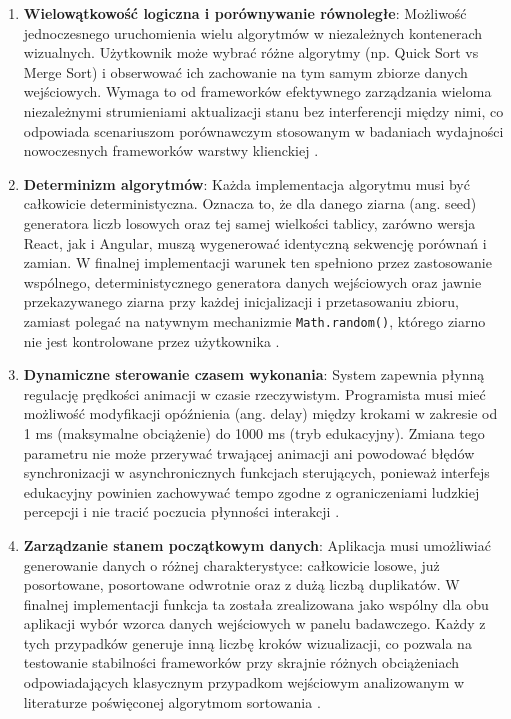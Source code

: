 \documentclass[12pt,openright,twoside]{report}
\begin{document}
\begin{enumerate}
  \item \textbf{Wielowątkowość logiczna i porównywanie równoległe}: Możliwość jednoczesnego uruchomienia wielu algorytmów w niezależnych kontenerach wizualnych. Użytkownik może wybrać różne algorytmy (np. Quick Sort vs Merge Sort) i obserwować ich zachowanie na tym samym zbiorze danych wejściowych. Wymaga to od frameworków efektywnego zarządzania wieloma niezależnymi strumieniami aktualizacji stanu bez interferencji między nimi, co odpowiada scenariuszom porównawczym stosowanym w badaniach wydajności nowoczesnych frameworków warstwy klienckiej \cite{Evaluating_Frameworks}.
  \item \textbf{Determinizm algorytmów}: Każda implementacja algorytmu musi być całkowicie deterministyczna. Oznacza to, że dla danego ziarna (ang. seed) generatora liczb losowych oraz tej samej wielkości tablicy, zarówno wersja React, jak i Angular, muszą wygenerować identyczną sekwencję porównań i zamian. W finalnej implementacji warunek ten spełniono przez zastosowanie wspólnego, deterministycznego generatora danych wejściowych oraz jawnie przekazywanego ziarna przy każdej inicjalizacji i przetasowaniu zbioru, zamiast polegać na natywnym mechanizmie \texttt{Math.random()}, którego ziarno nie jest kontrolowane przez użytkownika \cite{MDN_Math_Random}.
  \item \textbf{Dynamiczne sterowanie czasem wykonania}: System zapewnia płynną regulację prędkości animacji w czasie rzeczywistym. Programista musi mieć możliwość modyfikacji opóźnienia (ang. delay) między krokami w zakresie od 1 ms (maksymalne obciążenie) do 1000 ms (tryb edukacyjny). Zmiana tego parametru nie może przerywać trwającej animacji ani powodować błędów synchronizacji w asynchronicznych funkcjach sterujących, ponieważ interfejs edukacyjny powinien zachowywać tempo zgodne z ograniczeniami ludzkiej percepcji i nie tracić poczucia płynności interakcji \cite{Nielsen_Usability}.
  \item \textbf{Zarządzanie stanem początkowym danych}: Aplikacja musi umożliwiać generowanie danych o różnej charakterystyce: całkowicie losowe, już posortowane, posortowane odwrotnie oraz z dużą liczbą duplikatów. W finalnej implementacji funkcja ta została zrealizowana jako wspólny dla obu aplikacji wybór wzorca danych wejściowych w panelu badawczego. Każdy z tych przypadków generuje inną liczbę kroków wizualizacji, co pozwala na testowanie stabilności frameworków przy skrajnie różnych obciążeniach odpowiadających klasycznym przypadkom wejściowym analizowanym w literaturze poświęconej algorytmom sortowania \cite{Cormen_Intro, Knuth_Sorting}.
\end{enumerate}
\end{document}
